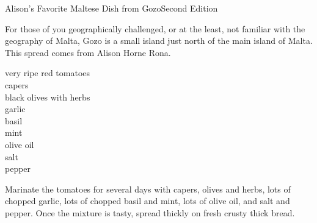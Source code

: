 \begin{entry}{Alison's Favorite Maltese Dish from Gozo}{Second Edition}

\begin{open}
  For those of you geographically challenged, or at the least, not familiar
  with the geography of Malta, Gozo is a small island just north of the main
  island of Malta.  This spread comes from Alison Horne Rona.
\end{open}
\begin{ingredients}
    very ripe red tomatoes\\
    capers\\
    black olives with herbs\\
    garlic\\
    basil\\
    mint\\
    olive oil\\
    salt\\
    pepper
\end{ingredients}
Marinate the tomatoes for several days with capers, olives and herbs, lots of
chopped garlic, lots of chopped basil and mint, lots of olive oil, and salt
and pepper.  Once the mixture is tasty, spread thickly on fresh crusty thick
bread.
\end{entry}

